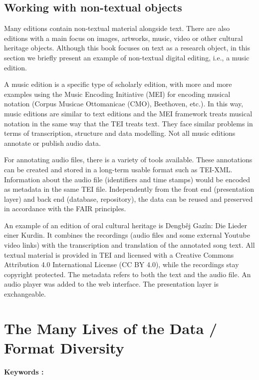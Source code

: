\documentclass[
  letterpaper,
  DIV=11,
  numbers=noendperiod]{scrreprt}
\begin{document}
\subsection{Working with non-textual
objects}\label{working-with-non-textual-objects}

Many editions contain non-textual material alongside text. There are
also editions with a main focus on images, artworks, music, video or
other cultural heritage objects. Although this book focuses on text as a
research object, in this section we briefly present an example of
non-textual digital editing, i.e., a music edition.

A music edition is a specific type of scholarly edition, with more and
more examples using the Music Encoding Initiative (MEI) for encoding
musical notation (Corpus Musicae Ottomanicae (CMO), Beethoven, etc.). In
this way, music editions are similar to text editions and the MEI
framework treats musical notation in the same way that the TEI treats
text. They face similar problems in terms of transcription, structure
and data modelling. Not all music editions annotate or publish audio
data.

For annotating audio files, there is a variety of tools available. These
annotations can be created and stored in a long-term usable format such
as TEI-XML. Information about the audio file (identifiers and time
stamps) would be encoded as metadata in the same TEI file. Independently
from the front end (presentation layer) and back end (database,
repository), the data can be reused and preserved in accordance with the
FAIR principles.

An example of an edition of oral cultural heritage is Dengbêj Gazîn: Die
Lieder einer Kurdin. It combines the recordings (audio files and some
external Youtube video links) with the transcription and translation of
the annotated song text. All textual material is provided in TEI and
licensed with a Creative Commons Attribution 4.0 International License
(CC BY 4.0), while the recordings stay copyright protected. The metadata
refers to both the text and the audio file. An audio player was added to
the web interface. The presentation layer is exchangeable.

\section{The Many Lives of the Data / Format
Diversity}\label{the-many-lives-of-the-data-format-diversity}

\textbf{Keywords :}
\end{document}
